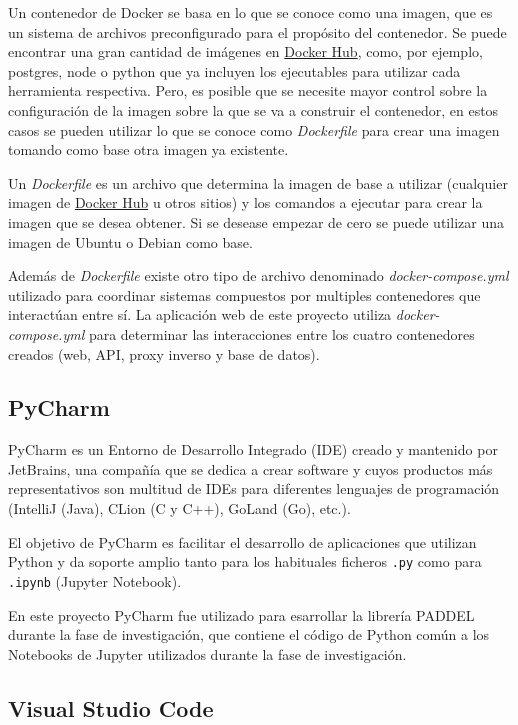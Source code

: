 Un contenedor de Docker se basa en lo que se conoce como una imagen, que es un
sistema de archivos preconfigurado para el propósito del contenedor. Se puede
encontrar una gran cantidad de imágenes en \href{https://hub.docker.com/}{Docker
Hub}, como, por ejemplo, postgres, node o python que ya incluyen los ejecutables
para utilizar cada herramienta respectiva. Pero, es posible que se necesite
mayor control sobre la configuración de la imagen sobre la que se va a construir
el contenedor, en estos casos se pueden utilizar lo que se conoce como
\textit{Dockerfile} para crear una imagen tomando como base otra imagen ya
existente.

Un \textit{Dockerfile} es un archivo que determina la imagen de base a utilizar
(cualquier imagen de \href{https://hub.docker.com/}{Docker Hub} u otros sitios)
y los comandos a ejecutar para crear la imagen que se desea obtener. Si se
desease empezar de cero se puede utilizar una imagen de Ubuntu o Debian como
base.

Además de \textit{Dockerfile} existe otro tipo de archivo denominado
\textit{docker-compose.yml} utilizado para coordinar sistemas compuestos por
multiples contenedores que interactúan entre sí. La aplicación web de este
proyecto utiliza \textit{docker-compose.yml} para determinar las interacciones
entre los cuatro contenedores creados (web, API, proxy inverso y base de
datos).

\subsection{PyCharm}

PyCharm es un Entorno de Desarrollo Integrado (IDE) creado y mantenido por
JetBrains, una compañía que se dedica a crear software y cuyos productos más
representativos son multitud de IDEs para diferentes lenguajes de programación
(IntelliJ (Java), CLion (C y C++), GoLand (Go), etc.).

El objetivo de PyCharm es facilitar el desarrollo de aplicaciones que utilizan
Python y da soporte amplio tanto para los habituales ficheros \texttt{.py} como
para \texttt{.ipynb} (Jupyter Notebook).

En este proyecto PyCharm fue utilizado para esarrollar la librería PADDEL
durante la fase de investigación, que contiene el código de Python común a los
Notebooks de Jupyter utilizados durante la fase de investigación.

\subsection{Visual Studio Code}

